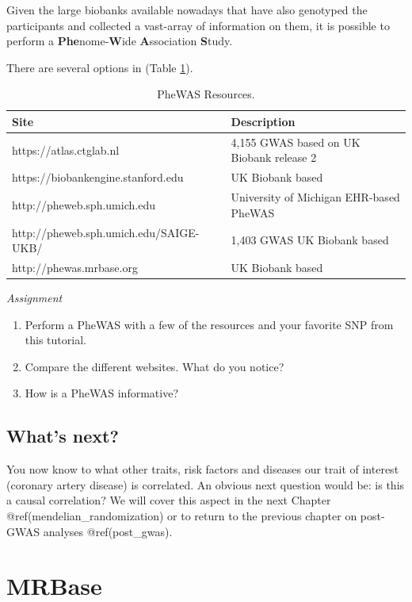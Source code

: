\documentclass[
]{book}
\providecommand{\tightlist}{%
  \setlength{\itemsep}{0pt}\setlength{\parskip}{0pt}}
\begin{document}
Given the large biobanks available nowadays that have also genotyped the participants and collected a vast-array of information on them, it is possible to perform a \textbf{Phe}nome-\textbf{W}ide \textbf{A}ssociation \textbf{S}tudy.

There are several options in (Table \ref{tab:tab-phewas}).

\begin{table}

\caption{\label{tab:tab-phewas}PheWAS Resources.}
\centering
\begin{tabular}[t]{l|l}
\hline
Site & Description\\
\hline
https://atlas.ctglab.nl & 4,155 GWAS based on UK Biobank release 2\\
\hline
https://biobankengine.stanford.edu & UK Biobank based\\
\hline
http://pheweb.sph.umich.edu & University of Michigan EHR-based PheWAS\\
\hline
http://pheweb.sph.umich.edu/SAIGE-UKB/ & 1,403 GWAS UK Biobank based\\
\hline
http://phewas.mrbase.org & UK Biobank based\\
\hline
\end{tabular}
\end{table}

\emph{Assignment}

\begin{enumerate}
\def\labelenumi{\arabic{enumi}.}
\tightlist
\item
  Perform a PheWAS with a few of the resources and your favorite SNP from this tutorial.
\item
  Compare the different websites. What do you notice?
\item
  How is a PheWAS informative?
\end{enumerate}

\hypertarget{whats-next}{%
\section{What's next?}\label{whats-next}}

You now know to what other traits, risk factors and diseases our trait of interest (coronary artery disease) is correlated. An obvious next question would be: is this a causal correlation? We will cover this aspect in the next Chapter @ref(mendelian\_randomization) or to return to the previous chapter on post-GWAS analyses @ref(post\_gwas).

\hypertarget{mr_mrbase}{%
\chapter{MRBase}\label{mr_mrbase}}
\end{document}
